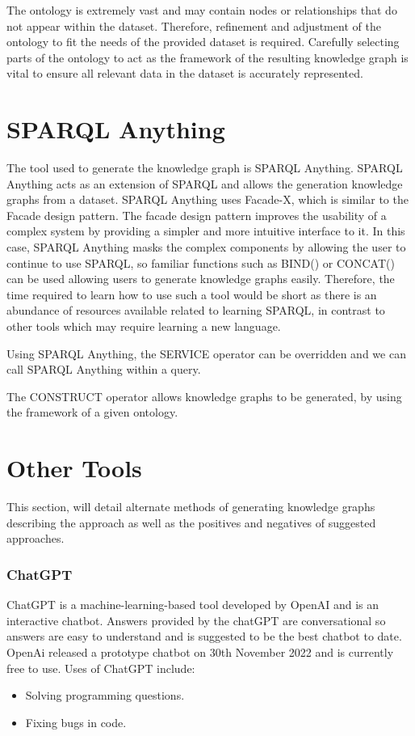 The ontology is extremely vast and may contain nodes or relationships that do not appear within the dataset. Therefore, refinement and adjustment of the ontology to fit the needs of the provided dataset is required. Carefully selecting parts of the ontology to act as the framework of the resulting knowledge graph is vital to ensure all relevant data in the dataset is accurately represented. 

\section{SPARQL Anything}
\hspace{0.5cm} The tool used to generate the knowledge graph is SPARQL Anything. SPARQL Anything acts as an extension of SPARQL and allows the generation knowledge graphs from a dataset. SPARQL Anything uses Facade-X, which is similar to the Facade design pattern. The facade design pattern improves the usability of a complex system by providing a simpler and more intuitive interface to it. In this case, SPARQL Anything masks the complex components by allowing the user to continue to use SPARQL, so familiar functions such as BIND() or CONCAT() can be used allowing users to generate knowledge graphs easily. Therefore, the time required to learn how to use such a tool would be short as there is an abundance of resources available related to learning SPARQL, in contrast to other tools which may require learning a new language. 

Using SPARQL Anything, the SERVICE operator can be overridden and we can call SPARQL Anything within a query. \cite{sparqlanything}

The CONSTRUCT operator allows knowledge graphs to be generated, by using the framework of a given ontology. \cite{sparqlanythinggithub}

\section{Other Tools}

\hspace{0.5cm} This section, will detail alternate methods of generating knowledge graphs describing the approach as well as the positives and negatives of suggested approaches.

\subsubsection{ChatGPT}
\hspace{0.5cm}  ChatGPT is a machine-learning-based tool developed by OpenAI and is an interactive chatbot. Answers provided by the chatGPT are conversational so answers are easy to understand and is suggested to be the best chatbot to date. \cite{chatgpt} OpenAi released a prototype chatbot on 30th November 2022 and is currently free to use. Uses of ChatGPT include:
\begin{itemize}
\item Solving programming questions.
\item Fixing bugs in code.
\end{itemize}

